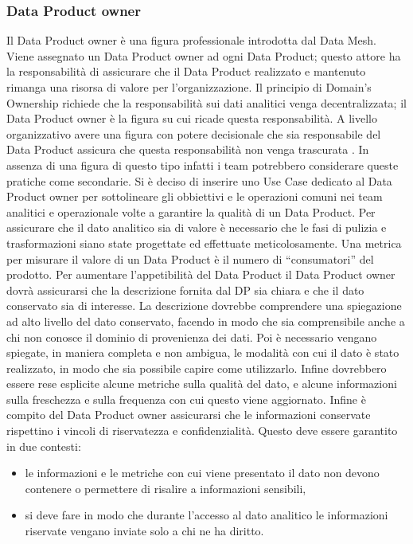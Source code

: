 \documentclass[12pt]{report}
\begin{document}
\subsubsection{Data Product owner}
Il Data Product owner è una figura professionale introdotta dal Data Mesh.
Viene assegnato un Data Product owner ad ogni Data Product; questo attore ha la responsabilità di assicurare che il Data Product realizzato e mantenuto rimanga una risorsa di valore per l'organizzazione. 
Il principio di Domain's Ownership richiede che la responsabilità sui dati analitici venga decentralizzata; il Data Product owner è la figura su cui ricade questa responsabilità.
A livello organizzativo avere una figura con potere decisionale che sia responsabile del Data Product assicura che questa responsabilità non venga trascurata .
In assenza di una figura di questo tipo infatti i team potrebbero considerare queste pratiche come secondarie.
Si è deciso di inserire uno Use Case dedicato al Data Product owner per sottolineare gli obbiettivi e le operazioni comuni nei team analitici e operazionale volte a garantire la qualità di un Data Product.
Per assicurare che il dato analitico sia di valore è necessario che le fasi di pulizia e trasformazioni siano state progettate ed  effettuate meticolosamente.
Una metrica per misurare il valore di un  Data Product è il numero di ``consumatori'' del prodotto.
Per aumentare l'appetibilità del Data Product il Data Product owner dovrà assicurarsi che la descrizione fornita dal DP sia chiara e che il dato conservato sia di interesse. 
La descrizione dovrebbe comprendere una spiegazione ad alto livello del dato conservato, facendo in modo che sia comprensibile anche a chi non conosce il dominio di provenienza dei dati.
Poi è necessario vengano spiegate, in maniera completa e non ambigua, le modalità con cui il dato è stato realizzato, in modo che sia possibile capire come utilizzarlo.
Infine dovrebbero essere rese esplicite alcune metriche sulla qualità del dato, e alcune informazioni sulla freschezza e sulla frequenza con cui questo viene aggiornato.
Infine è compito del Data Product owner assicurarsi che le informazioni conservate rispettino i vincoli di riservatezza e confidenzialità.
Questo deve essere garantito in due contesti:
\begin{itemize}
    \item le informazioni e le metriche con cui viene presentato il dato non devono contenere o permettere di risalire a informazioni sensibili,
    \item si deve fare in modo che durante l'accesso al dato analitico le informazioni riservate vengano inviate solo a chi ne ha diritto.
\end{itemize}
\end{document}
